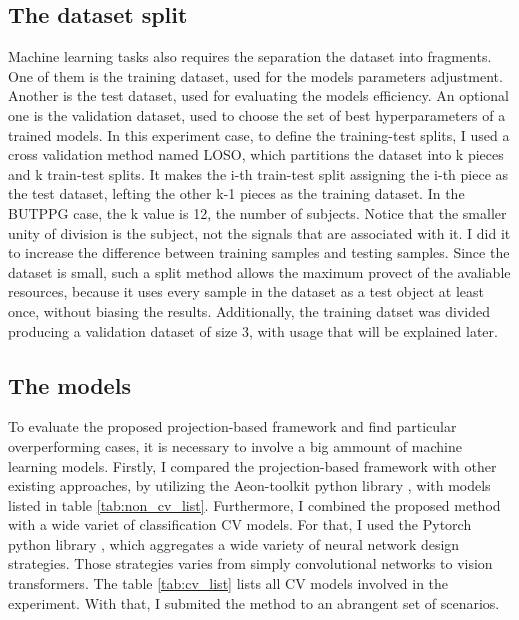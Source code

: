 \subsection{The dataset split}

Machine learning tasks also requires the separation the dataset into fragments. One of them is the training dataset, used for the models parameters adjustment. Another is the test dataset, used for evaluating the models efficiency. An optional one is the validation dataset, used to choose the set of best hyperparameters of a trained models. In this experiment case, to define the training-test splits, I used a cross validation method named \acrfull{LOSO}, which partitions the dataset into k pieces and k train-test splits. It makes the i-th train-test split assigning the i-th piece as the test dataset, lefting the other k-1 pieces as the training dataset. In the \acrshort{BUTPPG} case, the k value is 12, the number of subjects. Notice that the smaller unity of division is the subject, not the signals that are associated with it. I did it to increase the difference between training samples and testing samples. Since the dataset is small, such a split method allows the maximum provect of the avaliable resources, because it uses every sample in the dataset as a test object at least once, without biasing the results. Additionally, the training datset was divided producing a validation dataset of size 3, with usage that will be explained later.

\subsection{The models}

To evaluate the proposed projection-based framework and find particular overperforming cases, it is necessary to involve a big ammount of machine learning models. Firstly, I compared the projection-based framework with other existing approaches, by utilizing the Aeon-toolkit python library \cite{AeonDoc}, with models listed in table \ref{tab:non_cv_list}. Furthermore, I combined the proposed method with a wide variet of classification \acrshort{CV} models. For that, I used the Pytorch python library \cite{PytorchDoc}, which aggregates a wide variety of neural network design strategies. Those strategies varies from simply convolutional networks to vision transformers. The table \ref{tab:cv_list} lists all \acrshort{CV} models involved in the experiment. With that, I submited the method to an abrangent set of scenarios.

